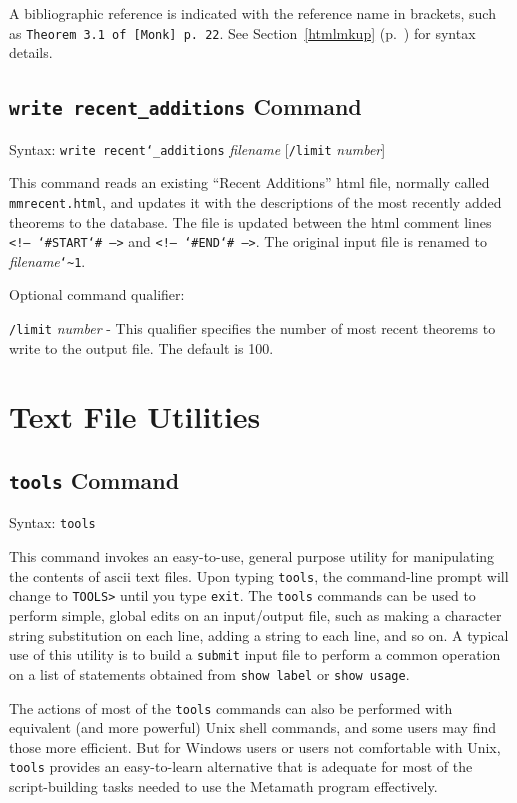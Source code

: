 A bibliographic reference is indicated with the reference name
in brackets, such as  \texttt{Theorem 3.1 of
[Monk] p.\ 22}.
See Section~\ref{htmlmkup} (p.~\pageref{htmlmkup}) for
syntax details.


\subsection{\texttt{write recent\_additions}
Command}
Syntax:  \texttt{write recent{\char`\_}additions} {\em filename}
[\texttt{/limit} {\em number}]

This command reads an existing ``Recent Additions'' {\sc html} file,
normally called \texttt{mmrecent.html}, and updates it with the
descriptions of the most recently added theorems to the database.
 The file is updated between
the {\sc html} comment lines \texttt{<!-- {\char`\#}START{\char`\#} -->}
and \texttt{<!-- {\char`\#}END{\char`\#} -->}.  The original input file
is renamed to {\em filename}\texttt{{\char`\~}1}.

Optional command qualifier:

    \texttt{/limit} {\em number} -
 This qualifier specifies the number of most recent theorems to
   write to the output file.  The default is 100.


\section{Text File Utilities}

\subsection{\texttt{tools} Command}
Syntax:  \texttt{tools}

This command invokes an easy-to-use, general purpose utility for
manipulating the contents of {\sc ascii} text files.  Upon typing
\texttt{tools}, the command-line prompt will change to \texttt{TOOLS>}
until you type \texttt{exit}.  The \texttt{tools} commands can be used
to perform simple, global edits on an input/output file,
such as making a character string substitution on each line, adding a
string to each line, and so on.  A typical use of this utility is
to build a \texttt{submit} input file to perform a common operation on a
list of statements obtained from \texttt{show label} or \texttt{show
usage}.

The actions of most of the \texttt{tools} commands can also be
performed with equivalent (and more powerful) Unix shell commands, and
some users may find those more efficient.  But for Windows users or
users not comfortable with Unix, \texttt{tools} provides an
easy-to-learn alternative that is adequate for most of the
script-building tasks needed to use the Metamath program effectively.

